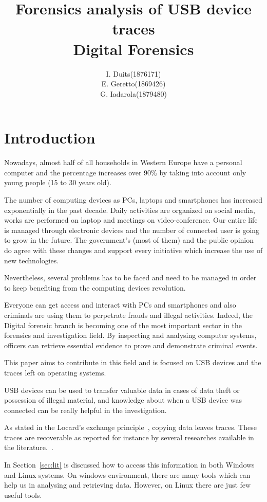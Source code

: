 \documentclass[a4paper]{article}
\title{Forensics analysis of USB device traces\\
\large Digital Forensics}
\author{
\begin{tabular}{>{\raggedleft}m{5cm}m{5cm}}
I. Duits & (1876171) \\
E. Geretto & (1869426) \\
G. Iadarola & (1879480) \\
\end{tabular}
}
\begin{document}
\maketitle

\section{Introduction}
Nowadays, almost half of all households in Western Europe have a personal
computer and the percentage increases over 90\% by taking into account only
young people (15 to 30 years old).

The number of computing devices as PCs, laptops and smartphones has increased
exponentially in the past decade. Daily activities are organized on social
media, works are performed on laptop and meetings on video-conference. Our
entire life is managed through electronic devices and the number of connected
user is going to grow in the future. The government's (most of them) and the
public opinion do agree with these changes and support every initiative which
increase the use of new technologies.

Nevertheless, several problems has to be faced and need to be managed in order
to keep benefiting from the computing devices revolution.

Everyone can get access and interact with PCs and smartphones and also criminals
are using them to perpetrate frauds and illegal activities. Indeed, the Digital
forensic branch is becoming one of the most important sector in the forensics
and investigation field. By inspecting and analysing computer systems, officers
can retrieve essential evidence to prove and demonstrate criminal events.

This paper aims to contribute in this field and is focused on USB devices and
the traces left on operating systems.

USB devices can be used to transfer valuable data in cases of data theft or
possession of illegal material, and knowledge about when a USB device was
connected can be really helpful in the investigation.

As stated in the Locard's exchange principle~\cite{locard2008locard}, copying
data leaves traces. These traces are recoverable as reported for instance by
several researches available in the literature.~\cite{Tanushree12,Abhijeet14}.

In Section~\ref{sec:lit} is discussed how to access this information in both
Windows and Linux systems. On windows environment, there are many tools which
can help us in analysing and retrieving data. However, on Linux there are just
few useful tools.
\end{document}
